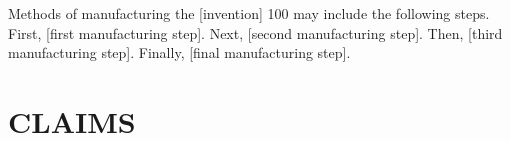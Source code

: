 \documentclass[12pt,letterpaper]{article}
\begin{document}
Methods of manufacturing the [invention] 100 may include the following steps. First, [first manufacturing step]. Next, [second manufacturing step]. Then, [third manufacturing step]. Finally, [final manufacturing step].

\newpage
\section*{CLAIMS}

\end{document}
